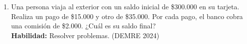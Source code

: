 \documentclass[11pt,letterpaper]{article}
\newenvironment{alternativas}{%
\begin{enumerate}[label=\Alph*), leftmargin=14pt, itemsep=2pt, topsep=2pt]
}{\end{enumerate}}
\begin{document}
\begin{enumerate}[label=\textbf{\arabic*.}, leftmargin=*, itemsep=8pt, start=6]
\item
\begin{minipage}[t]{\linewidth}
Una persona viaja al exterior con un saldo inicial de \$300.000 en su tarjeta. Realiza un pago de \$15.000 y otro de \$35.000. Por cada pago, el banco cobra una comisión de \$2.000. ¿Cuál es su saldo final?\\
\textbf{Habilidad:} Resolver problemas. (DEMRE 2024)\\
\\%
\begin{minipage}{\linewidth}
\vspace{7mm}
\end{minipage}
\vspace{7mm}
\end{minipage}


\end{enumerate}
\end{document}
